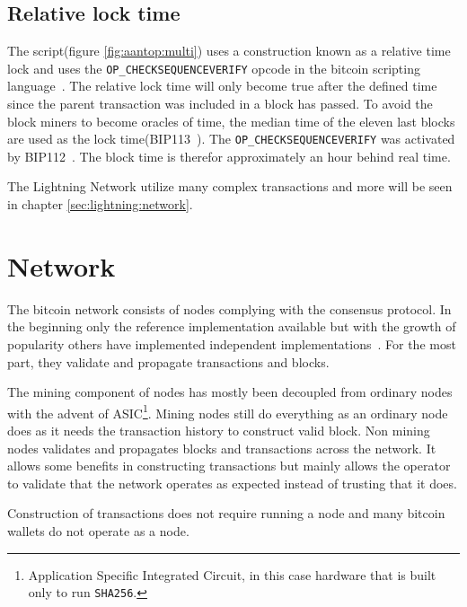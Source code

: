 \subsection{Relative lock time}
\label{sec:rlt}

The script(figure \ref{fig:aantop:multi}) uses a construction known as a relative time lock and uses the \texttt{OP\_CHECKSEQUENCEVERIFY} opcode in the bitcoin scripting language~\cite{bip:0068:sequence:lock:time}. The relative lock time will only become true after the defined time since the parent transaction was included in a block has passed. To avoid the block \gls{miner}s to become oracles of time, the median time of the eleven last blocks are used as the lock time(BIP113~\cite{bip:0113:median:time:passed}). The \texttt{OP\_CHECKSEQUENCEVERIFY} was activated by BIP112~\cite{bip:0112:sequence:lock:time:soft:fork}. The block time is therefor approximately an hour behind real time.

The Lightning Network utilize many complex transactions and more will be seen in chapter \ref{sec:lightning:network}.

\section{Network}

The \gls{bitcoin} network consists of \gls{node}s complying with the consensus protocol. In the beginning only the reference implementation available but with the growth of popularity others have implemented independent implementations~\cite{repository:bitcoin, repository:btcd, repository:neutrino}. For the most part,  they validate and propagate transactions and blocks.

The mining component of nodes has mostly been decoupled from ordinary nodes with the advent of ASIC\footnote{Application Specific Integrated Circuit, in this case hardware that is built only to run \texttt{SHA256}.}. Mining nodes still do everything as an ordinary node does as it needs the transaction history to construct valid block. Non mining nodes validates and propagates blocks and transactions across the network. It allows some benefits in constructing transactions but mainly allows the operator to validate that the network operates as expected instead of trusting that it does.

Construction of transactions does not require running a node and many bitcoin wallets do not operate as a \gls{node}.
